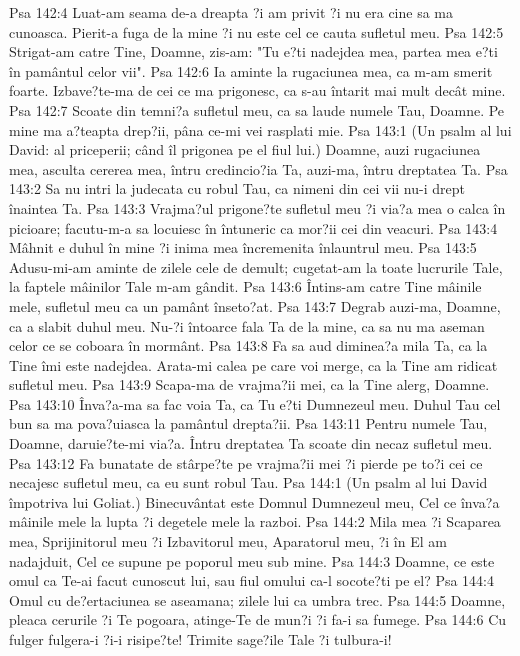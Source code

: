 Psa 142:4  Luat-am seama de-a dreapta ?i am privit ?i nu era cine sa ma cunoasca. Pierit-a fuga de la mine ?i nu este cel ce cauta sufletul meu.
Psa 142:5  Strigat-am catre Tine, Doamne, zis-am: "Tu e?ti nadejdea mea, partea mea e?ti în pamântul celor vii".
Psa 142:6  Ia aminte la rugaciunea mea, ca m-am smerit foarte. Izbave?te-ma de cei ce ma prigonesc, ca s-au întarit mai mult decât mine.
Psa 142:7  Scoate din temni?a sufletul meu, ca sa laude numele Tau, Doamne. Pe mine ma a?teapta drep?ii, pâna ce-mi vei rasplati mie.
Psa 143:1  (Un psalm al lui David: al priceperii; când îl prigonea pe el fiul lui.) Doamne, auzi rugaciunea mea, asculta cererea mea, întru credincio?ia Ta, auzi-ma, întru dreptatea Ta.
Psa 143:2  Sa nu intri la judecata cu robul Tau, ca nimeni din cei vii nu-i drept înaintea Ta.
Psa 143:3  Vrajma?ul prigone?te sufletul meu ?i via?a mea o calca în picioare; facutu-m-a sa locuiesc în întuneric ca mor?ii cei din veacuri.
Psa 143:4  Mâhnit e duhul în mine ?i inima mea încremenita înlauntrul meu.
Psa 143:5  Adusu-mi-am aminte de zilele cele de demult; cugetat-am la toate lucrurile Tale, la faptele mâinilor Tale m-am gândit.
Psa 143:6  Întins-am catre Tine mâinile mele, sufletul meu ca un pamânt înseto?at.
Psa 143:7  Degrab auzi-ma, Doamne, ca a slabit duhul meu. Nu-?i întoarce fala Ta de la mine, ca sa nu ma aseman celor ce se coboara în mormânt.
Psa 143:8  Fa sa aud diminea?a mila Ta, ca la Tine îmi este nadejdea. Arata-mi calea pe care voi merge, ca la Tine am ridicat sufletul meu.
Psa 143:9  Scapa-ma de vrajma?ii mei, ca la Tine alerg, Doamne.
Psa 143:10  Înva?a-ma sa fac voia Ta, ca Tu e?ti Dumnezeul meu. Duhul Tau cel bun sa ma pova?uiasca la pamântul drepta?ii.
Psa 143:11  Pentru numele Tau, Doamne, daruie?te-mi via?a. Întru dreptatea Ta scoate din necaz sufletul meu.
Psa 143:12  Fa bunatate de stârpe?te pe vrajma?ii mei ?i pierde pe to?i cei ce necajesc sufletul meu, ca eu sunt robul Tau.
Psa 144:1  (Un psalm al lui David împotriva lui Goliat.) Binecuvântat este Domnul Dumnezeul meu, Cel ce înva?a mâinile mele la lupta ?i degetele mele la razboi.
Psa 144:2  Mila mea ?i Scaparea mea, Sprijinitorul meu ?i Izbavitorul meu, Aparatorul meu, ?i în El am nadajduit, Cel ce supune pe poporul meu sub mine.
Psa 144:3  Doamne, ce este omul ca Te-ai facut cunoscut lui, sau fiul omului ca-l socote?ti pe el?
Psa 144:4  Omul cu de?ertaciunea se aseamana; zilele lui ca umbra trec.
Psa 144:5  Doamne, pleaca cerurile ?i Te pogoara, atinge-Te de mun?i ?i fa-i sa fumege.
Psa 144:6  Cu fulger fulgera-i ?i-i risipe?te! Trimite sage?ile Tale ?i tulbura-i!
